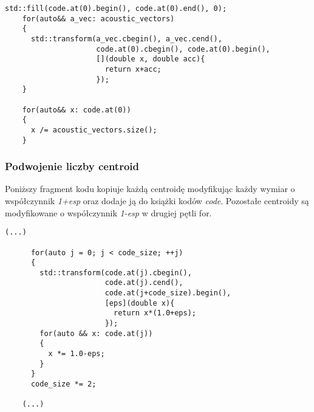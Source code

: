\begin{lstlisting}[style=lst:cpp, caption=Funkcja \textit{lbg}\label{lst:lbgbody2} - obliczenie pierwszej centroidy]
    std::fill(code.at(0).begin(), code.at(0).end(), 0);
    for(auto&& a_vec: acoustic_vectors)
    {
      std::transform(a_vec.cbegin(), a_vec.cend(),
                     code.at(0).cbegin(), code.at(0).begin(),
                     [](double x, double acc){
                       return x+acc;
                     }); 
    }

    for(auto&& x: code.at(0))
    {
      x /= acoustic_vectors.size();
    }
\end{lstlisting}
\subsubsection{Podwojenie liczby centroid}
Poniższy fragment kodu kopiuje każdą centroidę modyfikując każdy wymiar o współczynnik \textit{1+esp} oraz dodaje ją do książki kodów \textit{code}. Pozostałe centroidy są modyfikowane o współczynnik \textit{1-esp} w drugiej pętli for.
\begin{lstlisting}[style=lst:cpp, caption=Funkcja \textit{lbg}\label{lst:lbgbody3} - podwojenie liczby centroid]
    (...)

      for(auto j = 0; j < code_size; ++j)
      {
        std::transform(code.at(j).cbegin(),
                       code.at(j).cend(),
                       code.at(j+code_size).begin(),
                       [eps](double x){
                         return x*(1.0+eps); 
                       });
        for(auto && x: code.at(j))
        {
          x *= 1.0-eps;
        }
      }
      code_size *= 2;

    (...)
\end{lstlisting}
